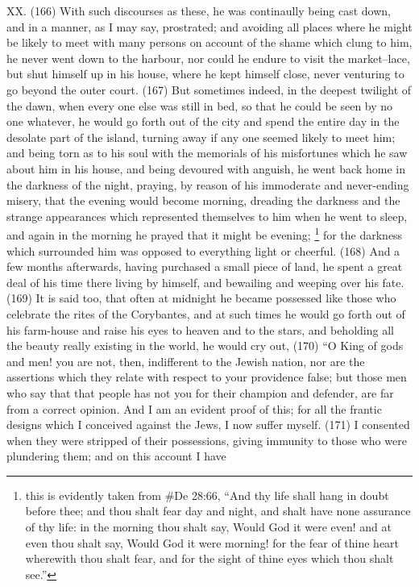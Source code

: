 XX. (166) With such discourses as these, he was continaully being cast down, and in a manner, as
I may say, prostrated; and avoiding all places where he might be likely to meet with many persons
on account of the shame which clung to him, he never went down to the harbour, nor could he
endure to visit the market--lace, but shut himself up in his house, where he kept himself close,
never venturing to go beyond the outer court. (167) But sometimes indeed, in the deepest twilight
of the dawn, when every one else was still in bed, so that he could be seen by no one whatever, he
would go forth out of the city and spend the entire day in the desolate part of the island, turning
away if any one seemed likely to meet him; and being torn as to his soul with the memorials of his
misfortunes which he saw about him in his house, and being devoured with anguish, he went back
home in the darkness of the night, praying, by reason of his immoderate and never-ending misery,
that the evening would become morning, dreading the darkness and the strange appearances
which represented themselves to him when he went to sleep, and again in the morning he prayed
that it might be evening; \footnote{this is evidently taken from \#De 28:66, ``And thy life shall hang in doubt before
thee; and thou shalt fear day and night, and shalt have none assurance of thy life: in the morning thou shalt say, Would
God it were even! and at even thou shalt say, Would God it were morning! for the fear of thine heart wherewith thou shalt
fear, and for the sight of thine eyes which thou shalt see.''} for the darkness which surrounded him was
opposed to everything light or cheerful. (168) And a few months afterwards, having purchased a
small piece of land, he spent a great deal of his time there living by himself, and bewailing and
weeping over his fate. (169) It is said too, that often at midnight he became possessed like those
who celebrate the rites of the Corybantes, and at such times he would go forth out of his
farm-house and raise his eyes to heaven and to the stars, and beholding all the beauty really
existing in the world, he would cry out, (170) ``O King of gods and men! you are not, then, indifferent
to the Jewish nation, nor are the assertions which they relate with respect to your providence false;
but those men who say that that people has not you for their champion and defender, are far from
a correct opinion. And I am an evident proof of this; for all the frantic designs which I conceived
against the Jews, I now suffer myself. (171) I consented when they were stripped of their
possessions, giving immunity to those who were plundering them; and on this account I have
